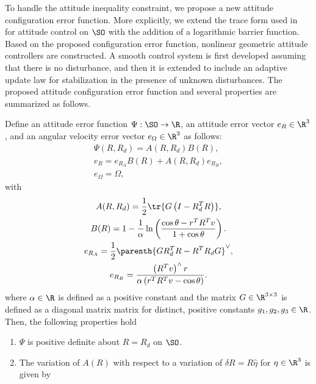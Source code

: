 To handle the attitude inequality constraint, we propose a new attitude configuration error function. 
More explicitly, we extend the trace form used in~\cite{bullo2004,LeeITCST13} for attitude control on \(\SO\) with the addition of a logarithmic barrier function. 
Based on the proposed configuration error function,  nonlinear geometric attitude controllers are constructed. 
A smooth control system is first developed assuming that there is  no disturbance, and then it is extended to include an adaptive update law for stabilization in the presence of unknown disturbances. 
The proposed attitude configuration error function and several properties are summarized as follows.

\begin{prop} \label{prop:config_error}
Define an attitude error function \( \Psi : \SO \to \R \), an attitude error vector \( e_R \in \R^3 \), and an angular velocity error vector \( e_\Omega \in \R^3 \) as follows:
\begin{gather}
	\Psi(R, R_d) = A(R, R_d) B(R) , \label{eqn:psi} \\
	e_R = e_{R_A} B(R) + A(R,R_d) e_{R_B} , \label{eqn:eR} \\
	e_\Omega = \Omega , \label{eqn:eW}
\end{gather}
with
\begin{gather}
	A(R,R_d) = \frac{1}{2} \tr{G \left( I - R_d^T R\right)} , \label{eqn:A} \\
	B(R) = 1 - \frac{1}{\alpha} \ln \left( \frac{\cos \theta -  r^T R^T v}{1 + \cos \theta}\right) . \label{eqn:B} \\
	e_{R_A} = \frac{1}{2} \parenth{G R_d^T R - R^T R_d G} ^ \vee , \label{eqn:eRA} \\
	e_{R_B} = \frac{ \left( R^T v\right)^\wedge r}{\alpha \left(r^T R^T v - \cos \theta \right)} . \label{eqn:eRB} 
\end{gather}	
where \( \alpha \in \R \) is defined as a positive constant and the matrix \( G \in \R^{3 \times 3} \) is defined as a diagonal matrix matrix for distinct, positive constants \( g_1, g_2, g_3 \in \R \).
Then, the following properties hold
\begin{enumerate}
	\item \label{item:prop_psi_psd} \(\Psi\) is positive definite about \( R = R_d\) on $\SO$.
	\item \label{item:prop_era}The variation of \( A(R) \) with respect to a variation of \( \delta R = R \hat{\eta} \) for \( \eta \in \R^3 \) is given by

\end{enumerate}
\end{prop}

